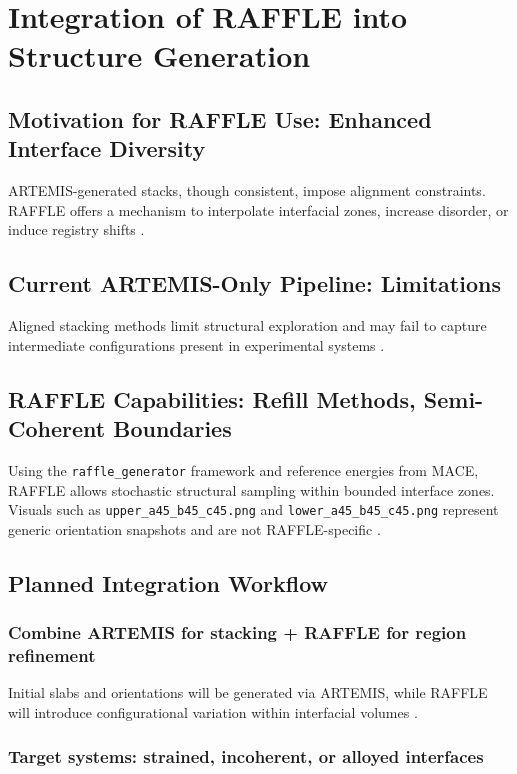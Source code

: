 \section{Integration of RAFFLE into Structure Generation}

\subsection{Motivation for RAFFLE Use: Enhanced Interface Diversity}

ARTEMIS-generated stacks, though consistent, impose alignment constraints. RAFFLE offers a mechanism to interpolate interfacial zones, increase disorder, or induce registry shifts .

\subsection{Current ARTEMIS-Only Pipeline: Limitations}

Aligned stacking methods limit structural exploration and may fail to capture intermediate configurations present in experimental systems .

\subsection{RAFFLE Capabilities: Refill Methods, Semi-Coherent Boundaries}

Using the \texttt{raffle\_generator} framework and reference energies from MACE, RAFFLE allows stochastic structural sampling within bounded interface zones. Visuals such as \texttt{upper\_a45\_b45\_c45.png} and \texttt{lower\_a45\_b45\_c45.png} represent generic orientation snapshots and are not RAFFLE-specific .

\subsection{Planned Integration Workflow}

\subsubsection{Combine ARTEMIS for stacking + RAFFLE for region refinement}

Initial slabs and orientations will be generated via ARTEMIS, while RAFFLE will introduce configurational variation within interfacial volumes .

\subsubsection{Target systems: strained, incoherent, or alloyed interfaces}

